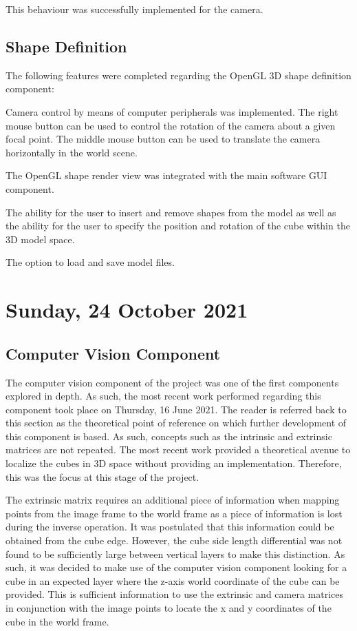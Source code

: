This behaviour was successfully implemented for the camera.

\subsection{Shape Definition}

The following features were completed regarding the OpenGL 3D shape definition component:

\begin{compactitem}
	\item Camera control by means of computer peripherals was implemented. The right mouse button can be used to control the rotation of the camera about a given focal point. The middle mouse button can be used to translate the camera horizontally in the world scene.
	\item The OpenGL shape render view was integrated with the main software \ac{GUI} component.
	\item The ability for the user to insert and remove shapes from the model as well as the ability for the user to specify the position and rotation of the cube within the 3D model space.
	\item The option to load and save model files.
\end{compactitem}

\pendsign

\section[2021/10/14]{Sunday, 24 October 2021}

\subsection{Computer Vision Component}

The computer vision component of the project was one of the first components explored in depth. As such, the most recent work performed regarding this component took place on Thursday, 16 June 2021. The reader is referred back to this section as the theoretical point of reference on which further development of this component is based. As such, concepts such as the intrinsic and extrinsic matrices are not repeated. The most recent work provided a theoretical avenue to localize the cubes in 3D space without providing an implementation. Therefore, this was the focus at this stage of the project.

The extrinsic matrix requires an additional piece of information when mapping points from the image frame to the world frame as a piece of information is lost during the inverse operation. It was postulated that this information could be obtained from the cube edge. However, the cube side length differential was not found to be sufficiently large between vertical layers to make this distinction. As such, it was decided to make use of the computer vision component looking for a cube in an expected layer where the z-axis world coordinate of the cube can be provided. This is sufficient information to use the extrinsic and camera matrices in conjunction with the image points to locate the x and y coordinates of the cube in the world frame.

